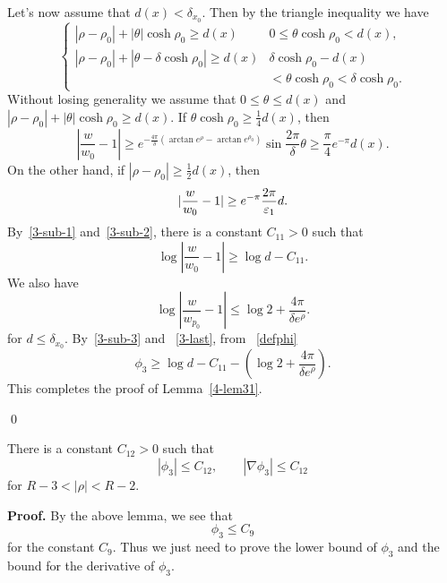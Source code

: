 Let's now assume that $d(x)<\delta_{x_0}$. Then by the triangle
inequality
we have 
\begin{equation}
\left\{
\begin{array}{ll}
|\rho-\rho_0|+|\theta|\cosh\rho_0\geq d(x) & 0\leq\theta
\cosh\rho_0<d(x),\\
|\rho-\rho_0|+|\theta-\delta\cosh\rho_0|\geq d(x) & \delta\cosh\rho_0-d(x)
\\&
<\theta\cosh\rho_0<\delta\cosh\rho_0.
\end{array}
\right.
\end{equation}
Without losing generality we assume that $0\leq\theta\leq d(x)$
and $|\rho-\rho_0|+|\theta|\cosh\rho_0\geq d(x)$. If $\theta
\cosh\rho_0\geq\frac 14 d(x)$,
then
\begin{equation}\label{3-sub-1}
|\frac{w}{w_0}-1|\geq
e^{-\frac{4\pi}{\delta}(\arctan e^\rho-\arctan e^{\rho_0})}
\sin\frac{2\pi}{\delta}\theta
\geq\frac\pi 4 e^{-\pi} d(x).
\end{equation}
On the other hand, if $|\rho-\rho_0|\geq\frac 12 d(x)$, then 
\begin{equation}\label{3-sub-2}
|\frac{w}{w_0}-1|\geq e^{-\pi}\frac{2\pi}{\varepsilon_1}d.
\end{equation}
By~\eqref{3-sub-1} and~\eqref{3-sub-2},
there is a
constant $C_{11}>0$ such that
\begin{equation}\label{3-sub-3}
\log|\frac{w}{w_0}-1|\geq\log d -C_{11}.
\end{equation}
We also have
\begin{equation}\label{3-last}
\log|\frac{w}{w_{p_0}}-1|\leq\log 2+\frac{4\pi}{\delta e^\rho}.
\end{equation}
for $d\leq\delta_{x_0}$. By~\eqref{3-sub-3} and ~\eqref{3-last},
from ~\eqref{defphi}
\[
\phi_3\geq\log d-C_{11}-(\log 2+\frac{4\pi}{\delta e^\rho}).
\]
This completes the proof of Lemma~\ref{4-lem31}.

\qed

\begin{lemma}\label{4-lem32}
There is a constant $C_{12}>0$ such that
\[
|\phi_3|\leq C_{12},\qquad |\nabla\phi_3|\leq C_{12}
\]
for $R-3<|\rho|<R-2$.
\end{lemma}

{\bf Proof.} By the above lemma, we see that
\[
\phi_3\leq C_9
\]
for the  constant $C_9$. 
Thus we just need to prove the lower bound of $\phi_3$ and the 
bound for the derivative of $\phi_3$.

